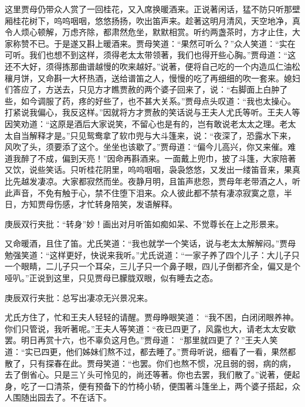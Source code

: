 \begin{parag}
    这里贾母仍带众人赏了一回桂花，又入席换暖酒来。正说著闲话，猛不防只听那壁厢桂花树下，呜呜咽咽，悠悠扬扬，吹出笛声来。趁著这明月清风，天空地净，真令人烦心顿解，万虑齐除，都肃然危坐，默默相赏。听约两盏茶时，方才止住，大家称赞不已。于是遂又斟上暖酒来。贾母笑道：“果然可听么？”众人笑道：“实在可听。我们也想不到这样，须得老太太带领著，我们也得开些心胸。”贾母道：“这还不大好，须得拣那曲谱越慢的吹来越好。”说著，便将自己吃的一个内造瓜仁油松穰月饼，又命斟一大杯热酒，送给谱笛之人，慢慢的吃了再细细的吹一套来。媳妇们答应了，方送去，只见方才瞧贾赦的两个婆子回来了，说：“右脚面上白肿了些，如今调服了药，疼的好些了，也不甚大关系。”贾母点头叹道：“我也太操心。打紧说我偏心，我反这样。”因就将方才贾赦的笑话说与王夫人尤氏等听。王夫人等因笑劝道：“这原是酒后大家说笑，不留心也是有的，岂有敢说老太太之理。老太太自当解释才是。”只见鸳鸯拿了软巾兜与大斗篷来，说：“夜深了，恐露水下来，风吹了头，须要添了这个。坐坐也该歇了。”贾母道：“偏今儿高兴，你又来催。难道我醉了不成，偏到天亮！”因命再斟酒来。一面戴上兜巾，披了斗篷，大家陪著又饮，说些笑话。只听桂花阴里，呜呜咽咽，袅袅悠悠，又发出一缕笛音来，果真比先越发凄凉。大家都寂然而坐。夜静月明，且笛声悲怨，贾母年老带酒之人，听此声音，不免有触于心，禁不住堕下泪来。众人彼此都不禁有凄凉寂寞之意，半日，方知贾母伤感，才忙转身陪笑，发语解释。\begin{note}庚辰双行夹批：“转身”妙！画出对月听笛如痴如呆、不觉尊长在上之形景来。\end{note}又命暖酒，且住了笛。尤氏笑道：“我也就学一个笑话，说与老太太解解闷。”贾母勉强笑道：“这样更好，快说来我听。”尤氏说道：“一家子养了四个儿子：大儿子只一个眼睛，二儿子只一个耳朵，三儿子只一个鼻子眼，四儿子倒都齐全，偏又是个哑叭。”正说到这里，只见贾母已朦胧双眼，似有睡去之态。\begin{note}庚辰双行夹批：总写出凄凉无兴景况来。\end{note}尤氏方住了，忙和王夫人轻轻的请醒。贾母睁眼笑道： “我不困，白闭闭眼养神。你们只管说，我听著呢。”王夫人等笑道：“夜已四更了，风露也大，请老太太安歇罢。明日再赏十六，也不辜负这月色。”贾母道： “那里就四更了？”王夫人笑道：“实已四更，他们姊妹们熬不过，都去睡了。”贾母听说，细看了一看，果然都散了，只有探春在此。贾母笑道：“也罢。你们也熬不惯，况且弱的弱，病的病，去了倒省心。只是三丫头可怜见的，尚还等著。你也去罢，我们散了。”说著，便起身，吃了一口清茶，便有预备下的竹椅小轿，便围著斗篷坐上，两个婆子搭起，众人围随出园去了。不在话下。
\end{parag}


